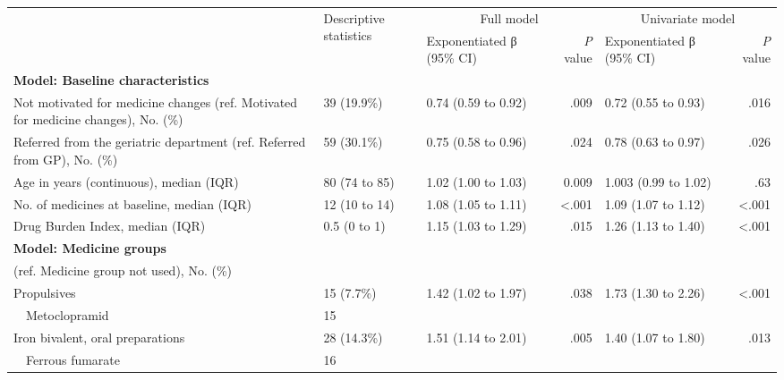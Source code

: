 \begin{table}[]
\begin{tabular}{p{7em}llrlr}
\toprule
\multirow{2}{*}{} &
  \multirow{2}{*}{Descriptive   statistics} &
  \multicolumn{2}{c}{Full model} &
  \multicolumn{2}{c}{Univariate model} \\ \cmidrule(l){3-6} 
                                           &             & Exponentiated   β (95\% CI) & \textit{P} value & Exponentiated β (95\% CI) & \textit{P} value        \\ \cmidrule(r){1-2}
{\textbf{Model:   Baseline characteristics}} & & & & & \\
Not motivated for medicine changes (ref.   Motivated for medicine changes), No. (\%) &
  39 (19.9\%) &
  0.74 (0.59 to 0.92) &
  .009 &
  0.72 (0.55 to 0.93) &
  .016 \\
Referred from the geriatric department   (ref. Referred from GP), No. (\%) &
  59 (30.1\%) &
  0.75 (0.58 to 0.96) &
  .024 &
  0.78 (0.63 to 0.97) &
  .026 \\
Age in years   (continuous), median (IQR) &
  80 (74 to 85) &
  1.02 (1.00 to 1.03) &
  0.009 &
  1.003 (0.99 to 1.02) &
  .63 \\
No. of medicines at baseline, median (IQR) &
  12 (10 to 14) &
  1.08 (1.05 to 1.11) &
  \textless .001 &
  1.09 (1.07 to 1.12) &
  \textless .001 \\
Drug Burden Index, median (IQR) &
  0.5 (0 to 1) &
  1.15 (1.03 to 1.29) &
  .015 &
  1.26 (1.13 to 1.40) &
  \textless .001 \\
\textbf{Model: Medicine   groups} &
  \multirow{2}{*}{} &
  \multirow{2}{*}{} &
  \multirow{2}{*}{} &
  \multirow{2}{*}{} &
  \multirow{2}{*}{} \\
(ref. Medicine   group not used), No. (\%) &             &                             &         &                           &                \\
Propulsives                                & 15 (7.7\%)  & 1.42 (1.02 to 1.97)         & .038    & 1.73 (1.30 to 2.26)       & \textless .001 \\
~~Metoclopramid                              & 15          &                             &         &                           &                \\
Iron bivalent, oral preparations           & 28 (14.3\%) & 1.51 (1.14 to 2.01)         & .005    & 1.40 (1.07 to 1.80)       & .013           \\
~~Ferrous fumarate                           & 16          &                             &         &                           &                \\

\end{tabular}
\end{table}
